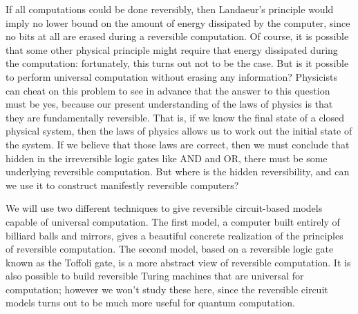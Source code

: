 If all computations could be done reversibly, then Landaeur's principle would imply no lower bound on the amount of energy dissipated by the computer, since no bits at all are erased during a reversible computation. Of course, it is possible that some other physical principle might require that energy dissipated during the computation: fortunately, this turns out not to be the case. But is it possible to perform universal computation without erasing any information? Physicists can cheat on this problem to see in advance that the answer to this question must be yes, because our present understanding of the laws of physics is that they are fundamentally reversible. That is, if we know the final state of a closed physical system, then the laws of physics allows us to work out the initial state of the system. If we believe that those laws are correct, then we must conclude that hidden in the irreversible logic gates like AND and OR, there must be some underlying reversible computation. But where is the hidden reversibility, and can we use it to construct manifestly reversible computers?

We will use two different techniques to give reversible circuit-based models capable of universal computation. The first model, a computer built entirely of billiard balls and mirrors, gives a beautiful concrete realization of the principles of reversible computation. The second model, based on a reversible logic gate known as the Toffoli gate, is a more abstract view of reversible computation. It is also possible to build reversible Turing machines that are universal for computation; however we won't study these here, since the reversible circuit models turns out to be much more useful for quantum computation.

